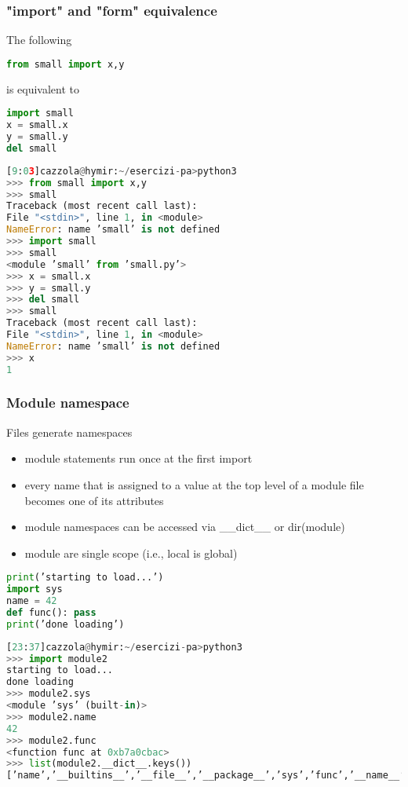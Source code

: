 \subsubsection{"import" and "form" equivalence}

The following
\begin{lstlisting}[language=Python]
from small import x,y
\end{lstlisting}

is equivalent to
\begin{lstlisting}[language=Python]
import small
x = small.x
y = small.y
del small
\end{lstlisting}

\begin{lstlisting}[language=Python]
[9:03]cazzola@hymir:~/esercizi-pa>python3
>>> from small import x,y
>>> small
Traceback (most recent call last):
File "<stdin>", line 1, in <module>
NameError: name ’small’ is not defined
>>> import small
>>> small
<module ’small’ from ’small.py’>
>>> x = small.x
>>> y = small.y
>>> del small
>>> small
Traceback (most recent call last):
File "<stdin>", line 1, in <module>
NameError: name ’small’ is not defined
>>> x
1
\end{lstlisting}

\subsubsection{Module namespace}
Files generate namespaces

\begin{itemize}
   \item module statements run once at the first import
   \item every name that is assigned to a value at the top level of a module file becomes one of its attributes
   \item module namespaces can be accessed via \_\_dict\_\_ or dir(module)
   \item  module are single scope (i.e., local is global)
\end{itemize}


\begin{lstlisting}[language=Python]
print(’starting to load...’)
import sys
name = 42
def func(): pass
print(’done loading’)
\end{lstlisting}

\begin{lstlisting}[language=Python]
[23:37]cazzola@hymir:~/esercizi-pa>python3
>>> import module2
starting to load...
done loading
>>> module2.sys
<module ’sys’ (built-in)>
>>> module2.name
42
>>> module2.func
<function func at 0xb7a0cbac>
>>> list(module2.__dict__.keys())
[’name’,’__builtins__’,’__file__’,’__package__’,’sys’,’func’,’__name__’,’__doc__’]
\end{lstlisting}

